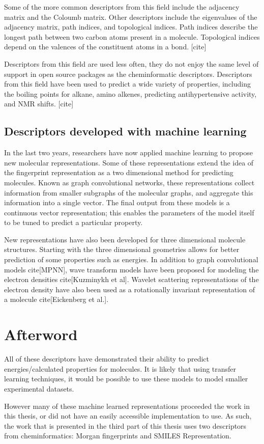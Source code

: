 Some of the more common descriptors from this field include the adjacency matrix and the Coloumb matrix. Other descriptors include the eigenvalues of the adjacency matrix, path indices, and topological indices. Path indices describe the longest path between two carbon atoms present in a molecule. Topological indices depend on the valences of the constituent atoms in a bond. [cite] 

Descriptors from this field are used less often, they do not enjoy the same level of support in open source packages as the cheminformatic descriptors. Descriptors from this field have been used to predict a wide variety of properties, including the boiling points for alkane, amino alkenes, predicting antihypertensive activity, and NMR shifts. [cite] 

\subsection{Descriptors developed with machine learning}

In the last two years, researchers have now applied machine learning to propose new molecular representations. Some of these representations extend the idea of the fingerprint representation as a two dimensional method for predicting molecules. Known as graph convolutional networks, these representations collect information from smaller subgraphs of the molecular graphs, and aggregate this information into a single vector. The final output from these models is a continuous vector representation; this enables the parameters of the model itself to be tuned to predict a particular property.

New representations have also been developed for three dimensional molecule structures.  Starting with the three dimensional geometries allows for better prediction of some properties such as energies. In addition to graph convolutional models cite[MPNN], wave transform models have been proposed for modeling the electron densities cite[Kuzminykh et al]. Wavelet scattering representations of the electron density have also been used as a rotationally invariant representation of a molecule cite[Eickenberg et al.].

\section{Afterword}

All of these descriptors have demonstrated their ability to predict energies/calculated properties for molecules. It is likely that using transfer learning techniques, it would be possible to use these models to model smaller experimental datasets. 

However many of these machine learned representations proceeded the work in this thesis, or did not have an easily accessible implementation to use. As such, the work that is presented in the third part of this thesis uses two descriptors from cheminformatics: Morgan fingerprints and SMILES Representation.

